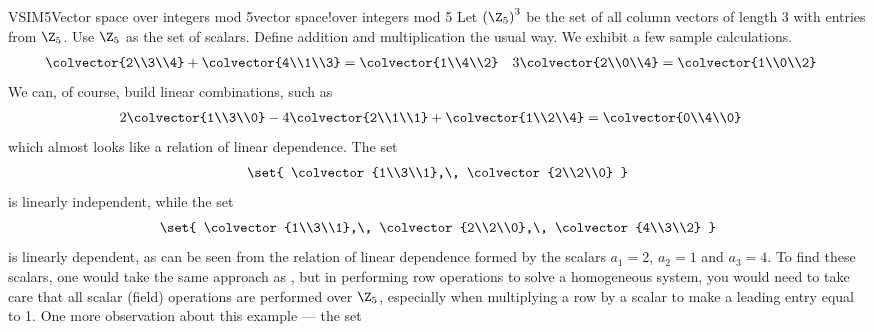 \begin{example}{VSIM5}{Vector space over integers mod 5}{vector space!over integers mod 5}
Let $\left(\Z_5\right)^3$ be the set of all column vectors of length $3$ with entries from $\Z_5$.  Use $\Z_5$ as the set of scalars.   Define addition and multiplication the usual way.  We exhibit a few sample calculations.
%
\begin{align*}
\colvector{2\\3\\4}+\colvector{4\\1\\3}&=\colvector{1\\4\\2}
&
3\colvector{2\\0\\4}&=\colvector{1\\0\\2}
\end{align*}
%
We can, of course, build linear combinations, such as
%
\begin{align*}
2\colvector{1\\3\\0}-4\colvector{2\\1\\1}+\colvector{1\\2\\4}&=\colvector{0\\4\\0}
\end{align*}
%
which almost looks like a relation of linear dependence.  The set
%
\begin{align*}
\set{
\colvector{1\\3\\1},\,
\colvector{2\\2\\0}
}
\end{align*}
%
is linearly independent, while the set
%
\begin{align*}
\set{
\colvector{1\\3\\1},\,
\colvector{2\\2\\0},\,
\colvector{4\\3\\2}
}
\end{align*}
%
is linearly dependent, as can be seen from the relation of linear dependence formed by the scalars $a_1=2$, $a_2=1$ and $a_3=4$.  To find these scalars, one would take the same approach as , but in performing row operations to solve a homogeneous system, you would need to take care that all scalar (field) operations are performed over $\Z_5$, especially when multiplying a row by a scalar to make a leading entry equal to 1.  One more observation about this example --- the set

\end{example}
